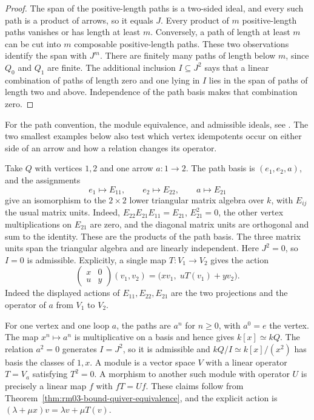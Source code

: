 \begin{proof}
The span of the positive-length paths is a two-sided ideal, and
every such path is a product of arrows, so it equals \(J\).
Every product of \(m\) positive-length paths vanishes or has
length at least \(m\). Conversely, a path of length at least \(m\)
can be cut into \(m\) composable positive-length paths. These two
observations identify the span with \(J^m\). There are finitely
many paths of length below \(m\), since \(Q_0\) and \(Q_1\) are
finite. The additional inclusion \(I\subseteq J^2\) says that a
linear combination of paths of length zero and one lying in \(I\)
lies in the span of paths of length two and above. Independence
of the path basis makes that combination zero.
\end{proof}

For the path convention, the module equivalence, and admissible
ideals, see \cite[Secs.~1.3--1.4]{quiver}. The two smallest
examples below also test which vertex idempotents occur on
either side of an arrow and how a relation changes its operator.

\begin{example}
\label{ex:rm03-one-arrow}
Take \(Q\) with vertices \(1,2\) and one arrow \(a\colon 1\to 2\).
The path basis is \((e_1,e_2,a)\), and the assignments
\[
 e_1\longmapsto E_{11},\qquad
 e_2\longmapsto E_{22},\qquad
 a\longmapsto E_{21}
\]
give an isomorphism to the \(2\times 2\) lower triangular
matrix algebra over \(k\), with \(E_{ij}\) the usual matrix
units. Indeed, \(E_{22}E_{21}E_{11}=E_{21}\),
\(E_{21}^2=0\), the other vertex multiplications on \(E_{21}\)
are zero, and the diagonal matrix units are orthogonal and
sum to the identity. These are the products of the path basis.
The three matrix units span the triangular algebra and are linearly
independent. Here \(J^2=0\), so \(I=0\) is admissible.
Explicitly, a single map \(T\colon V_1\to V_2\) gives the action
\[
 \begin{pmatrix}x&0\\ u&y\end{pmatrix}(v_1,v_2)
   =\bigl(xv_1,\;uT(v_1)+yv_2\bigr).
\]
Indeed the displayed actions of \(E_{11},E_{22},E_{21}\) are the
two projections and the operator of \(a\) from \(V_1\) to \(V_2\).
\end{example}

\begin{example}
\label{ex:rm03-square-zero-loop}
For one vertex and one loop \(a\), the paths are \(a^n\)
for \(n\geq 0\), with \(a^0=e\) the vertex. The map
\(x^n\mapsto a^n\) is multiplicative on a basis and hence gives
\(k[x]\simeq kQ\). The relation \(a^2=0\) generates \(I=J^2\),
so it is admissible and \(kQ/I\simeq k[x]/(x^2)\) has basis
the classes of \(1,x\). A module is a vector space \(V\) with a
linear operator \(T=V_a\) satisfying \(T^2=0\). A morphism to
another such module with operator \(U\) is precisely a linear
map \(f\) with \(fT=Uf\). These claims follow from
Theorem~\ref{thm:rm03-bound-quiver-equivalence}, and the explicit
action is \((\lambda+\mu x)v=\lambda v+\mu T(v)\).
\end{example}
